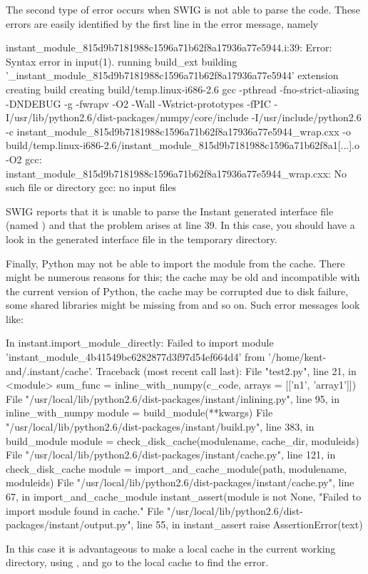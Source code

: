 The second type of error occurs when SWIG is not able to parse the
code. These errors are easily identified by the first line in the
error message, namely
\begin{progoutput}
instant_module_815d9b7181988c1596a71b62f8a17936a77e5944.i:39: Error: Syntax error in input(1).
running build_ext
building '_instant_module_815d9b7181988c1596a71b62f8a17936a77e5944' extension
creating build
creating build/temp.linux-i686-2.6
gcc -pthread -fno-strict-aliasing -DNDEBUG -g -fwrapv -O2 -Wall -Wstrict-prototypes -fPIC
   -I/usr/lib/python2.6/dist-packages/numpy/core/include -I/usr/include/python2.6
   -c instant_module_815d9b7181988c1596a71b62f8a17936a77e5944_wrap.cxx
   -o build/temp.linux-i686-2.6/instant_module_815d9b7181988c1596a71b62f8a1[...].o -O2
gcc: instant_module_815d9b7181988c1596a71b62f8a17936a77e5944_wrap.cxx: No such file or directory
gcc: no input files
\end{progoutput}
SWIG reports that it is unable to parse the Instant generated
interface file (named ) and that the problem arises at line
39.  In this case, you should have a look in the generated interface
file in the temporary directory.

Finally, Python may not be able to import the module from the
cache. There might be numerous reasons for this; the cache may be old
and incompatible with the current version of Python, the cache may be
corrupted due to disk failure, some shared libraries might be missing
from  and so on.  Such error messages look
like:
\begin{progoutput}
In instant.import_module_directly:
Failed to import module 'instant_module_4b41549bc6282877d3f97d54ef664d4' from '/home/kent-and/.instant/cache'.
Traceback (most recent call last):
  File "test2.py", line 21, in <module>
    sum_func = inline_with_numpy(c_code, arrays = [['n1', 'array1']])
  File "/usr/local/lib/python2.6/dist-packages/instant/inlining.py", line 95, in inline_with_numpy
    module = build_module(**kwargs)
  File "/usr/local/lib/python2.6/dist-packages/instant/build.py", line 383, in build_module
    module = check_disk_cache(modulename, cache_dir, moduleids)
  File "/usr/local/lib/python2.6/dist-packages/instant/cache.py", line 121, in check_disk_cache
    module = import_and_cache_module(path, modulename, moduleids)
  File "/usr/local/lib/python2.6/dist-packages/instant/cache.py", line 67, in import_and_cache_module
    instant_assert(module is not None, "Failed to import module found in cache."
  File "/usr/local/lib/python2.6/dist-packages/instant/output.py", line 55, in instant_assert
    raise AssertionError(text)
\end{progoutput}
In this case it is advantageous to make a local cache in the current working directory, using , and go
to the local cache to find the error.

